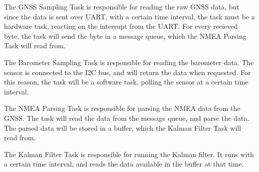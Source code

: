 The GNSS Sampling Task is responsible for reading the raw GNSS data, but since the data is sent over UART, with a certain time interval, the task must be a hardware task, reacting on the interrupt from the UART.
For every recieved byte, the task will send the byte in a message queue, which the NMEA Parsing Task will read from.

The Barometer Sampling Task is responsible for reading the barometer data.
The sensor is connected to the I2C bus, and will return the data when requested.
For this reason, the task will be a software task, polling the sensor at a certain time interval.

The NMEA Parsing Task is responsible for parsing the NMEA data from the GNSS.
The task will read the data from the message queue, and parse the data.
The parsed data will be stored in a buffer, which the Kalman Filter Task will read from.

The Kalman Filter Task is responsible for running the Kalman filter.
It runs with a certain time interval, and reads the data available in the buffer at that time.


%
